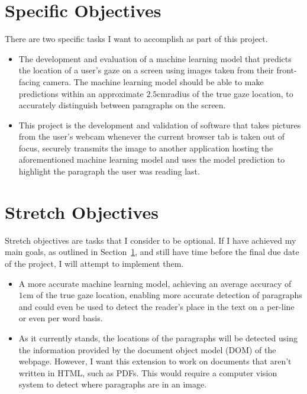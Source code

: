 \documentclass[twocolumn]{report}
\begin{document}
\section{Specific Objectives}\label{sec:specific-objectives}

There are two specific tasks I want to accomplish as part of this project.

\begin{itemize}
    \item The development and evaluation of a machine learning model that predicts the location of a user's gaze on a screen using images taken from their front-facing camera. The machine learning model should be able to make predictions within an approximate \(2.5\text{cm}\)radius of the true gaze location, to accurately distinguish between paragraphs on the screen.
    \item This project is the development and validation of software that takes pictures from the user's webcam whenever the current browser tab is taken out of focus, securely transmits the image to another application hosting the aforementioned machine learning model and uses the model prediction to highlight the paragraph the user was reading last.
\end{itemize}

\section{Stretch Objectives}

Stretch objectives are tasks that I consider to be optional. If I have achieved my main goals, as outlined in Section~\ref{sec:specific-objectives}, and still have time before the final due date of the project, I will attempt to implement them.

\begin{itemize}
    \item A more accurate machine learning model, achieving an average accuracy of \(1\text{cm}\) of the true gaze location, enabling more accurate detection of paragraphs and could even be used to detect the reader's place in the text on a per-line or even per word basis.

    \item As it currently stands, the locations of the paragraphs will be detected using the information provided by the document object model (DOM) of the webpage. However, I want this extension to work on documents that aren't written in HTML, such as PDFs. This would require a computer vision system to detect where paragraphs are in an image.
\end{itemize}
\end{document}
